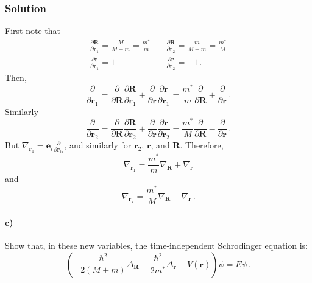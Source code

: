 \documentclass[letterpaper,10pt]{article}
\def\mbf{\mathbf}
\def\R{\mathbf{R}}
\def\r{\mathbf{r}}
\begin{document}
\subsubsection*{Solution}
First note that
\[
\begin{array}{rl}
\frac{\partial \R}{\partial \r_1}=\frac{M}{M+m}=\frac{m^*}{m}\quad
& \frac{\partial \R}{\partial \r_2}=\frac{m}{M+m}=\frac{m^*}{M}\\
\frac{\partial \r}{\partial \r_1}=1 \quad& \frac{\partial \r}{\partial \r_2}=-1
\,.
\end{array}
\]
Then,
\[
\frac{\partial}{\partial\r_1}=
\frac{\partial}{\partial\R}\frac{\partial\R}{\partial\r_1}
+\frac{\partial}{\partial\r}\frac{\partial\r}{\partial\r_1}
=\frac{m^*}{m}\frac{\partial}{\partial\R}+\frac{\partial}{\partial\r}\,.
\]
Similarly
\[
\frac{\partial}{\partial\r_2}=
\frac{\partial}{\partial\R}\frac{\partial\R}{\partial\r_2}
+\frac{\partial}{\partial\r}\frac{\partial\r}{\partial\r_2}
=\frac{m^*}{M}\frac{\partial}{\partial\R}-\frac{\partial}{\partial\r}\,.
\]
But $\nabla_{\r_1}=\mbf{e}_i\frac{\partial}{\partial\r_{1i}}$, and similarly
for $\r_2$, $\r$, and $\R$. Therefore,
\[
\nabla_{\r_1}=\frac{m^*}{m}\nabla_\R+\nabla_\r
\]
and
\[
\nabla_{\r_2}=\frac{m^*}{M}\nabla_\R-\nabla_\r\,.
\]
\paragraph*{c)} Show that, in these new variables, the time-independent
Schrodinger equation is:
\[
\left(-\frac{\hbar^2}{2(M+m)}\Delta_\R-\frac{\hbar^2}{2m^*}\Delta_\r
+V(\r)\right)\psi=E\psi\,.
\]
\end{document}

